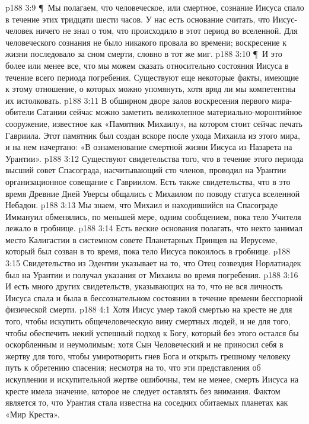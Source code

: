 \vs p188 3:9 \P\ \bibnobreakspace Мы полагаем, что человеческое, или смертное, сознание Иисуса спало в течение этих тридцати шести часов. У нас есть основание считать, что Иисус\hyp{}человек ничего не знал о том, что происходило в этот период во вселенной. Для человеческого сознания не было никакого провала во времени; воскресение к жизни последовало за сном смерти, словно в тот же миг.
\vs p188 3:10 \P\ И это более или менее все, что мы можем сказать относительно состояния Иисуса в течение всего периода погребения. Существуют еще некоторые факты, имеющие к этому отношение, о которых можно упомянуть, хотя вряд ли мы компетентны их истолковать.
\vs p188 3:11 В обширном дворе залов воскресения первого мира\hyp{}обители Сатании сейчас можно заметить великолепное материально\hyp{}моронтийное сооружение, известное как «Памятник Михаилу», на котором стоит сейчас печать Гавриила. Этот памятник был создан вскоре после ухода Михаила из этого мира, и на нем начертано: «В ознаменование смертной жизни Иисуса из Назарета на Урантии».
\vs p188 3:12 Существуют свидетельства того, что в течение этого периода высший совет Спасограда, насчитывающий сто членов, проводил на Урантии организационное совещание с Гавриилом. Есть также свидетельства, что в это время Древние Дней Уверсы общались с Михаилом по поводу статуса вселенной Небадон.
\vs p188 3:13 Мы знаем, что Михаил и находившийся на Спасограде Иммануил обменялись, по меньшей мере, одним сообщением, пока тело Учителя лежало в гробнице.
\vs p188 3:14 Есть веские основания полагать, что некто занимал место Калигастии в системном совете Планетарных Принцев на Иерусеме, который был созван в то время, пока тело Иисуса покоилось в гробнице.
\vs p188 3:15 Свидетельство из Эдентии указывает на то, что Отец созвездия Норлатиадек был на Урантии и получал указания от Михаила во время погребения.
\vs p188 3:16 И есть много других свидетельств, указывающих на то, что не вся личность Иисуса спала и была в бессознательном состоянии в течение времени бесспорной физической смерти.
\vs p188 4:1 Хотя Иисус умер такой смертью на кресте не для того, чтобы искупить общечеловеческую вину смертных людей, и не для того, чтобы обеспечить некий успешный подход к Богу, который без этого остался бы оскорбленным и неумолимым; хотя Сын Человеческий и не приносил себя в жертву для того, чтобы умиротворить гнев Бога и открыть грешному человеку путь к обретению спасения; несмотря на то, что эти представления об искуплении и искупительной жертве ошибочны, тем не менее, смерть Иисуса на кресте имела значение, которое не следует оставлять без внимания. Фактом является то, что Урантия стала известна на соседних обитаемых планетах как «Мир Креста».
